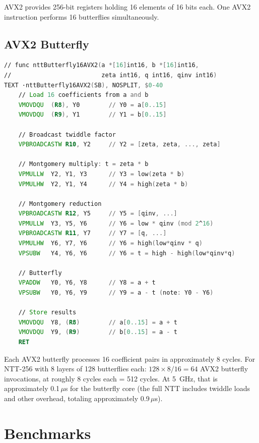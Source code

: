 \documentclass[11pt,a4paper]{article}
\begin{document}
AVX2 provides 256-bit registers holding 16 elements of 16 bits each. One AVX2 instruction
performs 16 butterflies simultaneously.

\subsection{AVX2 Butterfly}

\begin{lstlisting}[language=asm,caption={AVX2 NTT butterfly (Go Plan 9 assembly)}]
// func nttButterfly16AVX2(a *[16]int16, b *[16]int16,
//                         zeta int16, q int16, qinv int16)
TEXT ·nttButterfly16AVX2(SB), NOSPLIT, $0-40
    // Load 16 coefficients from a and b
    VMOVDQU  (R8), Y0        // Y0 = a[0..15]
    VMOVDQU  (R9), Y1        // Y1 = b[0..15]

    // Broadcast twiddle factor
    VPBROADCASTW R10, Y2     // Y2 = [zeta, zeta, ..., zeta]

    // Montgomery multiply: t = zeta * b
    VPMULLW  Y2, Y1, Y3      // Y3 = low(zeta * b)
    VPMULHW  Y2, Y1, Y4      // Y4 = high(zeta * b)

    // Montgomery reduction
    VPBROADCASTW R12, Y5     // Y5 = [qinv, ...]
    VPMULLW  Y3, Y5, Y6      // Y6 = low * qinv (mod 2^16)
    VPBROADCASTW R11, Y7     // Y7 = [q, ...]
    VPMULHW  Y6, Y7, Y6      // Y6 = high(low*qinv * q)
    VPSUBW   Y4, Y6, Y6      // Y6 = t = high - high(low*qinv*q)

    // Butterfly
    VPADDW   Y0, Y6, Y8      // Y8 = a + t
    VPSUBW   Y0, Y6, Y9      // Y9 = a - t (note: Y0 - Y6)

    // Store results
    VMOVDQU  Y8, (R8)        // a[0..15] = a + t
    VMOVDQU  Y9, (R9)        // b[0..15] = a - t
    RET
\end{lstlisting}

Each AVX2 butterfly processes 16 coefficient pairs in approximately 8 cycles. For NTT-256
with 8 layers of 128 butterflies each: $128 \times 8 / 16 = 64$ AVX2 butterfly invocations,
at roughly 8 cycles each = 512 cycles. At 5~GHz, that is approximately 0.1\,$\mu$s for
the butterfly core (the full NTT includes twiddle loads and other overhead, totaling
approximately 0.9\,$\mu$s).

\section{Benchmarks}
\end{document}
